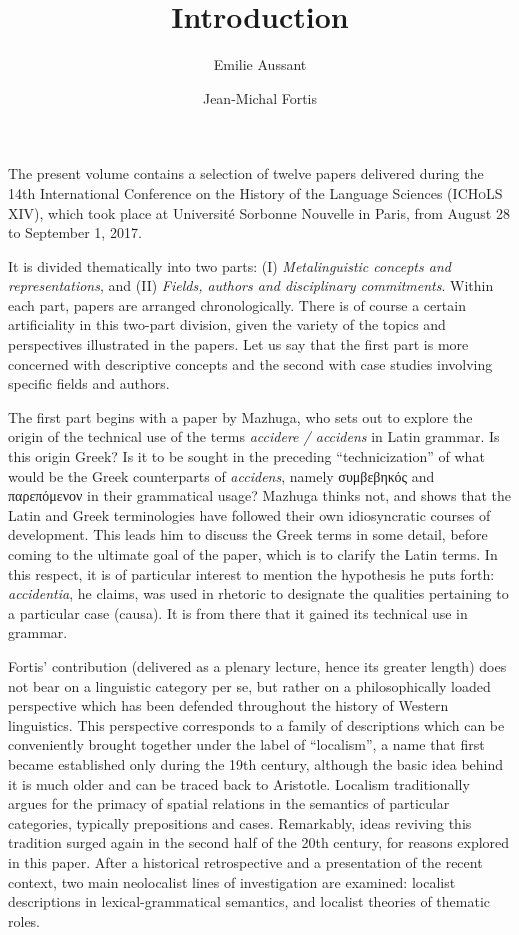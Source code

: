 \documentclass[output=paper]{langsci/langscibook}
\title{Introduction}
\author{Emilie Aussant\affiliation{Histoire des Théories Linguistiques (CNRS / Université de Paris)}\and Jean-Michal Fortis\affiliation{Histoire des Théories Linguistiques (CNRS / Université de Paris)}}
\begin{document}
\maketitle

\noindent The present volume contains a selection of twelve papers delivered during the 14th International Conference on the History of the Language Sciences (\textsc{ICHoLS XIV}), which took place at Université Sorbonne Nouvelle in Paris, from August 28 to September 1, 2017.

It is divided thematically into two parts: (I) \emph{Metalinguistic concepts and representations}, and (II) \emph{Fields, authors and disciplinary commitments}. Within each part, papers are arranged chronologically. There is of course a certain artificiality in this two-part division, given the variety of the topics and perspectives illustrated in the papers. Let us say that the first part is more concerned with descriptive concepts and the second with case studies involving specific fields and authors.

The first part begins with a paper by Mazhuga, who sets out to explore the origin of the technical use of the terms \emph{accidere / accidens} in Latin grammar. Is this origin Greek? Is it to be sought in the preceding ``technicization'' of what would be the Greek counterparts of \emph{accidens}, namely συμβεβηκός and παρεπόμενον in their grammatical usage? Mazhuga thinks not, and shows that the Latin and Greek terminologies have followed their own idiosyncratic courses of development. This leads him to discuss the Greek terms in some detail, before coming to the ultimate goal of the paper, which is to clarify the Latin terms. In this respect, it is of particular interest to mention the hypothesis he puts forth: \emph{accidentia}, he claims, was used in rhetoric to designate the qualities pertaining to a particular case (causa). It is from there that it gained its technical use in grammar.

Fortis' contribution (delivered as a plenary lecture, hence its greater length) does not bear on a linguistic category per se, but rather on a philosophically loaded perspective which has been defended throughout the history of Western linguistics. This perspective corresponds to a family of descriptions which can be conveniently brought together under the label of ``localism'', a name that first became established only during the 19th century, although the basic idea behind it is much older and can be traced back to Aristotle. Localism traditionally argues for the primacy of spatial relations in the semantics of particular categories, typically prepositions and cases. Remarkably, ideas reviving this tradition surged again in the second half of the 20th century, for reasons explored in this paper. After a historical retrospective and a presentation of the recent context, two main neolocalist lines of investigation are examined: localist descriptions in lexical-grammatical semantics, and localist theories of thematic roles.
\end{document}
